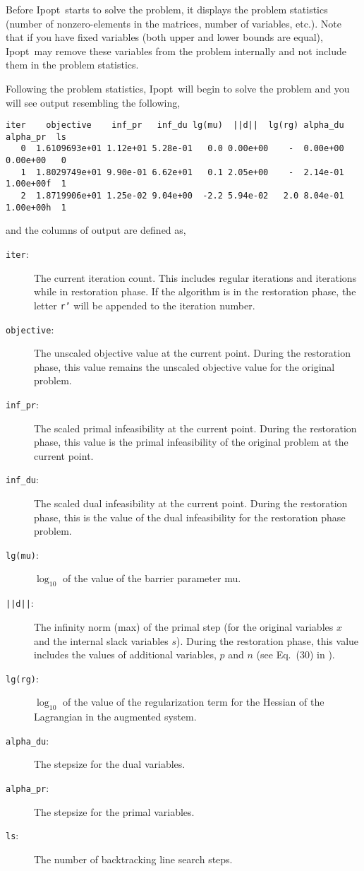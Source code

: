 \documentclass[10pt]{article}
\newcommand{\Ipopt}{{\sc Ipopt}}
\begin{document}
Before \Ipopt\ starts to solve the problem, it displays the problem
statistics (number of nonzero-elements in the matrices, number of
variables, etc.). Note that if you have fixed variables (both upper
and lower bounds are equal), \Ipopt\ may remove these variables from
the problem internally and not include them in the problem statistics.

Following the problem statistics, \Ipopt\ will begin to solve the
problem and you will see output resembling the following,
\begin{verbatim}
iter    objective    inf_pr   inf_du lg(mu)  ||d||  lg(rg) alpha_du alpha_pr  ls
   0  1.6109693e+01 1.12e+01 5.28e-01   0.0 0.00e+00    -  0.00e+00 0.00e+00   0
   1  1.8029749e+01 9.90e-01 6.62e+01   0.1 2.05e+00    -  2.14e-01 1.00e+00f  1
   2  1.8719906e+01 1.25e-02 9.04e+00  -2.2 5.94e-02   2.0 8.04e-01 1.00e+00h  1
\end{verbatim}
and the columns of output are defined as,
\begin{description}
\item[{\tt iter}:] The current iteration count. This includes regular
  iterations and iterations while in restoration phase. If the
  algorithm is in the restoration phase, the letter {\tt r'} will be
  appended to the iteration number.
\item[{\tt objective}:] The unscaled objective value at the current
  point. During the restoration phase, this value remains the unscaled
  objective value for the original problem.
\item[{\tt inf\_pr}:] The scaled primal infeasibility at the current
  point. During the restoration phase, this value is the primal
  infeasibility of the original problem at the current point.
\item[{\tt inf\_du}:] The scaled dual infeasibility at the current
  point. During the restoration phase, this is the value of the dual
  infeasibility for the restoration phase problem.
\item[{\tt lg(mu)}:] $\log_{10}$ of the value of the barrier parameter mu.
\item[{\tt ||d||}:] The infinity norm (max) of the primal step (for
  the original variables $x$ and the internal slack variables $s$).
  During the restoration phase, this value includes the values of
  additional variables, $p$ and $n$ (see Eq.~(30) in
  \cite{WaecBieg06:mp}).
\item[{\tt lg(rg)}:] $\log_{10}$ of the value of the regularization
  term for the Hessian of the Lagrangian in the augmented system.
\item[{\tt alpha\_du}:] The stepsize for the dual variables.
\item[{\tt alpha\_pr}:] The stepsize for the primal variables.
\item[{\tt ls}:] The number of backtracking line search steps.
\end{description}
\end{document}
